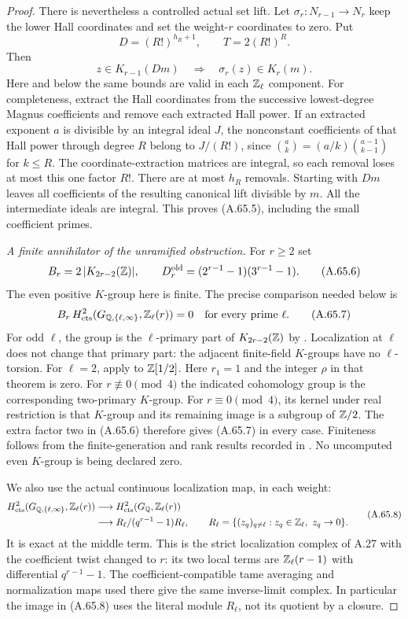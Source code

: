 \begin{proof}
There is nevertheless a controlled actual set lift.  Let
$\sigma_r:N_{r-1}\to N_r$ keep the lower Hall coordinates and set the
weight-$r$ coordinates to zero.  Put
\[
       D=(R!)^{h_R+1},\qquad T=2(R!)^R.
 \tag{A.65.4}
\]
Then
\[
             z\in K_{r-1}(Dm)
        \quad\Longrightarrow\quad \sigma_r(z)\in K_r(m).
 \tag{A.65.5}
\]
Here and below the same bounds are valid in each $\mathbb Z_\ell$ component.
For completeness, extract the Hall coordinates from the successive
lowest-degree Magnus coefficients and remove each extracted Hall
power.  If an extracted exponent $a$ is divisible by an integral ideal
$J$, the nonconstant coefficients of that Hall power through degree $R$
belong to $J/(R!)$, since
$\binom ak=(a/k)\binom{a-1}{k-1}$ for $k\leq R$.
The coordinate-extraction matrices are integral, so each removal loses
at most this one factor $R!$.  There are at most $h_R$ removals.
Starting with $Dm$ leaves all coefficients of the resulting canonical
lift divisible by $m$.  All the intermediate ideals are integral.
This proves (A.65.5), including the small coefficient primes.

\emph{A finite annihilator of the unramified obstruction.}
For $r\geq2$ set
\[
 B_r=2\,|K_{2r-2}(\mathbb Z)|,\qquad
 D_r^{\rm old}=(2^{r-1}-1)(3^{r-1}-1).
 \tag{A.65.6}
\]
The even positive $K$-group here is finite.  The precise comparison
needed below is
\[
 B_r\,H^2_{\rm cts}
       (G_{\mathbb Q,\{\ell,\infty\}},\mathbb Z_\ell(r))=0
                  \quad\hbox{for every prime }\ell.
 \tag{A.65.7}
\]
For odd $\ell$, the group is the $\ell$-primary part of
$K_{2r-2}(\mathbb Z)$ by \cite[VI.8.2]{Weibel2013}.
Localization at $\ell$ does not change that primary part: the adjacent
finite-field $K$-groups have no $\ell$-torsion.
For $\ell=2$, apply \cite[VI.9.11]{Weibel2013} to $\mathbb Z[1/2]$.
Here $r_1=1$ and the integer $\rho$ in that theorem is zero.
For $r\not\equiv0\pmod4$ the indicated cohomology group is the
corresponding two-primary $K$-group.  For $r\equiv0\pmod4$, its kernel
under real restriction is that $K$-group and its remaining image is a
subgroup of $\mathbb Z/2$.  The extra factor two in (A.65.6) therefore gives
(A.65.7) in every case.  Finiteness follows from the finite-generation
and rank results recorded in \cite[IV.1.18, IV.6.9, VI.8.1]{Weibel2013}.
No uncomputed even $K$-group is being declared zero.

We also use the actual continuous localization map, in each weight:
\[
 \begin{split}
 H^2_{\rm cts}(G_{\mathbb Q,\{\ell,\infty\}},\mathbb Z_\ell(r))
   &\longrightarrow H^2_{\rm cts}(G_\mathbb Q,\mathbb Z_\ell(r))\\
   &\longrightarrow
 R_\ell/(q^{r-1}-1)R_\ell,\qquad
 R_\ell=\{(z_q)_{q\ne\ell}:z_q\in\mathbb Z_\ell,\ z_q\to0\}.
 \end{split}
 \tag{A.65.8}
\]
It is exact at the middle term.  This is the strict localization
complex of A.27 with the coefficient twist changed to $r$:
its two local terms are $\mathbb Z_\ell(r-1)$ with differential
$q^{r-1}-1$.  The coefficient-compatible tame averaging and
normalization maps used there give the same inverse-limit complex.
In particular the image in (A.65.8) uses the literal module $R_\ell$,
not its quotient by a closure.


\end{proof}
